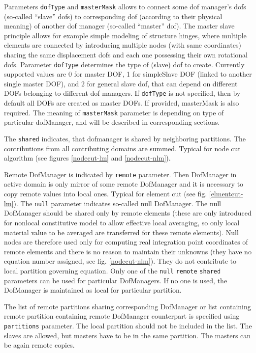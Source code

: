 \documentclass[a4paper]{article}
\newcommand{\param}[1]{\texttt{#1}} %
\newcommand{\Pmode}[1]{{\sffamily #1}}
\begin{document}
Parameters \param{dofType} and \param{masterMask} allows to connect some dof manager's dofs
(so-called ``slave'' dofs)
to corresponding dof (according to their physical meaning) of another
dof manager (so-called ``master'' dof). The master slave principle
allows for example simple modeling of structure hinges, where multiple
elements are connected by introducing multiple nodes (with same
coordinates) sharing the same displacement dofs and each one possessing
their own rotational dofs.
Parameter
\param{dofType} determines the type of (slave) dof to
create. Currently supported values are 0 for master DOF, 1 for simpleSlave DOF (linked to another single master DOF), and 2 for general
slave dof, that can depend on different DOFs belonging to different
dof managers.
If \param{dofType} is not specified, then by default all DOFs are
created as master DOFs. If provided, masterMask is also required.
The meaning of \param{masterMask} parameter is
depending on type of particular dofManager, and will be described in
corresponding sections.

\Pmode{
The \param{shared} indicates, that dofmanager is shared by
neighboring partitions. The contributions from all contributing
domains are summed. Typical for node cut algorithm (see figures \ref{nodecut-lm}
and \ref{nodecut-nlm}).

Remote DofManager is indicated by \param{remote} parameter.
Then DofManager in active domain is only mirror of some remote
DofManager and it is necessary to copy remote values into local
ones. Typical for element cut (see fig. \ref{elmentcut-lm}).
The \param{null} parameter indicates so-called null DofManager. The
null DofManager should be shared only by remote elements (these are
only introduced for nonlocal constitutive model to allow effective
local averaging, so only local material value to be averaged are
transferred for these remote elements). Null nodes are therefore used
only for computing real integration point coordinates of remote
elements and there is no reason to maintain their unknowns (they have
no equation number assigned, see fig. \ref{nodecut-nlm}). They do not
contribute to local partition governing equation.
Only one of the \param{null} \param{remote} \param{shared} parameters can
be used for particular DofManagers. If no one is used, the DofManager
is maintained as local for particular partition.

The list of remote partitions sharing corresponding DofManager or list
containing  remote partition containing remote DofManager counterpart is
specified using \param{partitions} parameter. The local partition
should not be included in the list.
The slaves are allowed, but masters have to be in the same
partition. The masters can be again remote copies.
}
\end{document}

